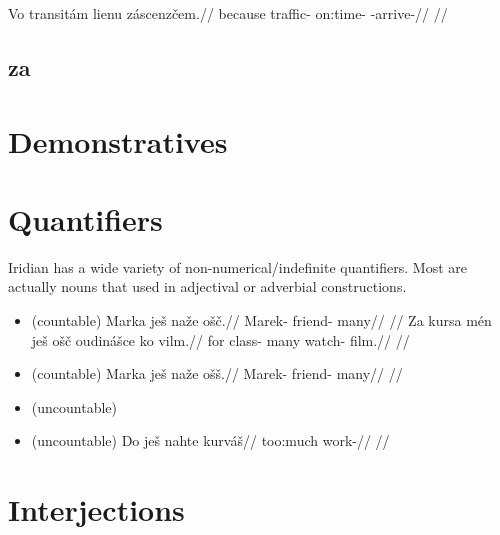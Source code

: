 \pex
\begingl
\gla Vo transitám lienu záscenzčem.//
\glb because traffic-\Agt{} on:time-\Ins{} \Neg{}-arrive-//
\glft {}//
\endgl
\xe

\subsection{za}


\section{Demonstratives}\label{dem-adj}

\section{Quantifiers}
Iridian has a wide variety of non-numerical/indefinite quantifiers.  Most are actually nouns that used in adjectival or adverbial constructions.


\begin{itemize}
    \item {}  (countable)
    \ex
    \begingl
    \gla Marka ješ naže ošč.//
    \glb Marek-\Acc{} \Exst{} friend-\Gen{} many//
    \glft {}//
    \endgl
    \xe
    \ex
    \begingl
    \gla Za kursa mén ješ ošč oudinášce ko vilm.//
    \glb for class-\Acc{}  \Exst{} many watch-\Sup{} \Att{} film.//
    \glft {}//
    \endgl
    \xe
    \item {}  (countable)
    \ex
    \begingl
    \gla Marka ješ naže ošš.//
    \glb Marek-\Acc{} \Exst{} friend-\Gen{} many//
    \glft {}//
    \endgl
    \xe
    \item {}  (uncountable)
    \item {}  (uncountable)
    \ex
    \begingl
    \gla Do ješ nahte kurváš//
    \glb {} \Exst{} too:much work-//
    \glft {}//
    \endgl
    \xe

\end{itemize}

\section{Interjections}

